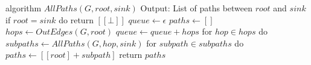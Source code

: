 \begin{Pseudocode}[float,caption={DFS-based algorithm which generates a list of all possible paths between between two nodes in a DAG},label={alg:all-paths}]
algorithm $AllPaths(G, root, sink)	$
	Output: List of paths between $root$ and $sink$
	if $root = sink$ do
		return $[[\bot]]$
	$queue \leftarrow \epsilon$
	$paths \leftarrow []$
	$hops \leftarrow OutEdges(G, root)$
	$queue \leftarrow queue + hops$
	for $hop \in hops$ do
		$subpaths \leftarrow AllPaths(G, hop, sink)$
		for $subpath \in subpaths$ do
			$paths \leftarrow [[root] + subpath]$
	return $paths$
\end{Pseudocode}
